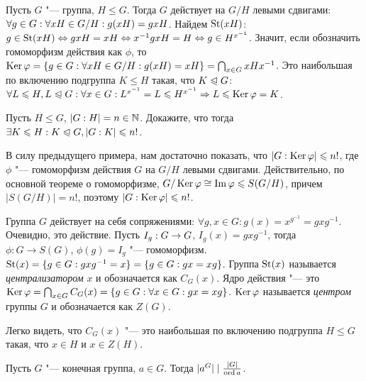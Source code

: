 \begin{example}
	Пусть $G$ "--- группа, $H \le G$. Тогда $G$ действует на $G / H$ левыми сдвигами: $\forall g \hm\in G: \forall xH \in G / H: g(xH) = gxH$. Найдем $\operatorname{St}(xH)$: $g \in \St(xH) \Leftrightarrow gxH = xH \Leftrightarrow x^{-1}gxH \hm= H \Leftrightarrow g \hm\in H^{x^{-1}}$. Значит, если обозначить гомоморфизм действия как $\phi$, то $\ke\phi \hm= \{g \hm\in G: \forall xH \in G / H: g(xH) = xH\} = \bigcap_{x \in G} xHx^{-1}$. Это наибольшая по включению подгруппа $K \le H$ такая, что $K \trianglelefteqslant G$: $\forall L \le H, L \normal G: \forall x \in G: L^{x^{-1}} = L \le H^{x^{-1}} \ra L \hm\le \ke\phi = K$.
\end{example}

\begin{exercise}
	Пусть $H \le G$, $|G : H| = n \in \mathbb{N}$. Докажите, что тогда $\exists K \le H: K \hm\normal G, |G : K| \le n!$.
\end{exercise}

\begin{solution}
	В силу предыдущего примера, нам достаточно показать, что $|G : \operatorname{Ker}\varphi| \leqslant n!$, где $\phi$ "--- гомоморфизм действия $G$ на $G / H$ левыми сдвигами. Действительно, по основной теореме о гомоморфизме, $G / \operatorname{Ker}\varphi \cong \operatorname{Im}\varphi \leqslant S(G / H)$, причем $|S(G / H)| = n!$, поэтому $|G : \operatorname{Ker}\varphi| \leqslant n!$.
\end{solution}

\begin{example}
	Группа $G$ действует на себя сопряжениями: $\forall g, x \in G: g(x) = x^{g^{-1}} = gxg^{-1}$. Очевидно, это действие. Пусть $I_g: G \hm\to G$, $I_g(x) = gxg^{-1}$, тогда $\phi: G \to S(G)$, $\phi(g) = I_g$ "--- гомоморфизм. $\operatorname{St}(x) = \{g \in G: gxg^{-1} = x\} = \{g \in G: gx = xg\}$. Группа $\operatorname{St}(x)$ называется \textit{централизатором} $x$ и обозначается как $C_G(x)$. Ядро действия "--- это $\ke\phi \hm= \bigcap_{x \in G} C_G(x) \hm= \{g \in G: \forall x \in G: gx = xg\}$. $\operatorname{Ker}\varphi$ называется \textit{центром} группы $G$ и обозначается как $Z(G)$.
\end{example}

\begin{note}
	Легко видеть, что $C_G(x)$ "--- это наибольшая по включению подгруппа $H \le G$ такая, что $x \in H$ и $x \in Z(H)$.
\end{note}

\begin{proposition}
	Пусть $G$ "--- конечная группа, $a \in G$. Тогда $|a^G| \mid \frac{|G|}{\operatorname{ord} a}$.
\end{proposition}

